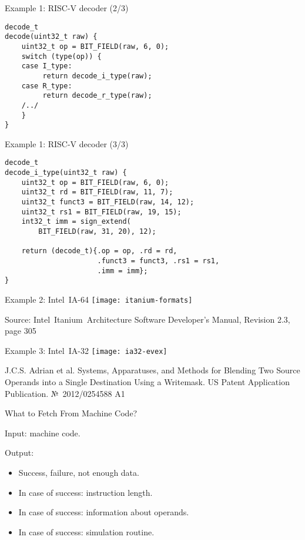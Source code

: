 \begin{frame}[fragile]{Example 1: RISC-V decoder (2/3)}
\begin{lstlisting}
decode_t
decode(uint32_t raw) {
    uint32_t op = BIT_FIELD(raw, 6, 0);
    switch (type(op)) {
    case I_type:
         return decode_i_type(raw);
    case R_type:
         return decode_r_type(raw);
    /../
    }
}
\end{lstlisting}
\end{frame}

\begin{frame}[fragile]{Example 1: RISC-V decoder (3/3)}
\begin{lstlisting}
decode_t
decode_i_type(uint32_t raw) {
    uint32_t op = BIT_FIELD(raw, 6, 0);
    uint32_t rd = BIT_FIELD(raw, 11, 7);
    uint32_t funct3 = BIT_FIELD(raw, 14, 12);
    uint32_t rs1 = BIT_FIELD(raw, 19, 15);
    int32_t imm = sign_extend(
        BIT_FIELD(raw, 31, 20), 12);

    return (decode_t){.op = op, .rd = rd,
                      .funct3 = funct3, .rs1 = rs1,
                      .imm = imm};
}
\end{lstlisting}
\end{frame}

\begin{frame}{Example 2: Intel\reg~IA-64}
\centering
\texttt{[image: itanium-formats]}

\tiny{Source: Intel\reg~Itanium\reg~Architecture Software
      Developer’s Manual, Revision 2.3, page 305}
\end{frame}

\begin{frame}{Example 3: Intel\reg~IA-32}
\centering
\texttt{[image: ia32-evex]}

\tiny{J.C.S. Adrian et al. Systems, Apparatuses, and Methods for Blending Two
      Source Operands into a Single Destination Using a Writemask. US Patent
      Application Publication. №~2012/0254588 A1}
\end{frame}

\begin{frame}{What to Fetch From Machine Code?}
\begin{centering}
\end{centering}
\vfill
Input: machine code.

Output:
\begin{itemize}
\item Success, failure, not enough data.
\item In case of success: instruction length.
\item In case of success: information about operands.
\item In case of success: simulation routine.
\end{itemize}
\end{frame}

